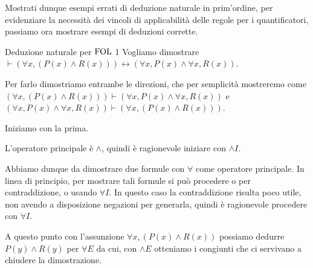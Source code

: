 Mostrati dunque esempi errati di deduzione naturale in prim'ordine, per evidenziare la necessità dei vincoli di applicabilità delle regole per i quantificatori, passiamo ora mostrare esempi di deduzioni corrette.


\begin{example}{Deduzione naturale per \(\FOL\) 1}
  Vogliamo dimostrare \(\vdash (\forall x, (P(x) \land R(x)))\leftrightarrow (\forall x, P(x) \land \forall x, R(x))\).

  Per farlo dimostriamo entrambe le direzioni, che per semplicità mostreremo come \((\forall x, (P(x) \land R(x)))\vdash (\forall x, P(x) \land \forall x, R(x))\) e \((\forall x, P(x) \land \forall x, R(x))\vdash (\forall x, (P(x) \land R(x)))\).

  Iniziamo con la prima.

  L'operatore principale è \(\land\), quindi è ragionevole iniziare con \(\land I\).

  \begin{prooftree}
  \end{prooftree}

  Abbiamo dunque da dimostrare due formule con \(\forall\) come operatore principale. In linea di principio, per mostrare tali formule si può procedere o per contraddizione, o usando \(\forall I\). In questo caso la contraddizione risulta poco utile, non avendo a disposizione negazioni per generarla, quindi è ragionevole procedere con \(\forall I\).
  
  \begin{prooftree}
  \end{prooftree}

  A questo punto con l'assunzione \(\forall x, (P(x) \land R(x))\) possiamo dedurre \(P(y) \land R(y)\) per \(\forall E\) da cui, con \(\land E\) otteniamo i congiunti che ci servivano a chiudere la dimostrazione.

   \begin{prooftree}


\end{prooftree}
\end{example}
